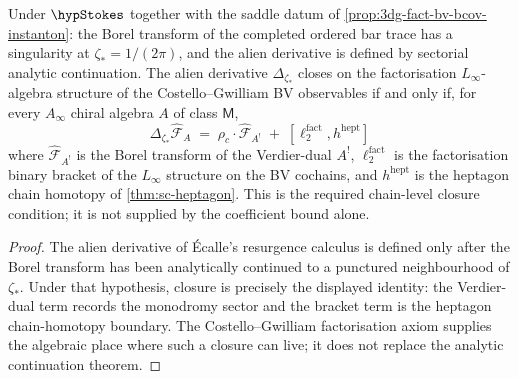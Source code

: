 \begin{theorem}
\label{thm:3dg-alien-derivative-fact-bv-closure}%
%
%
%
Under $\hypStokes$ together with the saddle datum of
\autoref{prop:3dg-fact-bv-bcov-instanton}: the Borel transform of the
completed ordered bar trace has a singularity at
$\zeta_{\ast} = 1/(2\pi)$, and the alien derivative is defined by
sectorial analytic continuation. The alien derivative
$\Delta_{\zeta_{\ast}}$ closes on the factorisation
$L_{\infty}$-algebra structure of the Costello--Gwilliam BV
observables if and only if, for every $A_{\infty}$ chiral algebra $A$
of class $\mathsf M$,
\[
 \Delta_{\zeta_{\ast}}\widehat{\mathcal F}_{A}
 \;=\;
 \rho_{c}\cdot\widehat{\mathcal F}_{A^{!}}
 \;+\;
 [\ell_{2}^{\mathrm{fact}}, h^{\mathrm{hept}}]
\]
where $\widehat{\mathcal F}_{A^{!}}$ is the Borel transform of the
Verdier-dual $A^{!}$, $\ell_{2}^{\mathrm{fact}}$ is the factorisation
binary bracket of the $L_\infty$ structure on the BV cochains, and
$h^{\mathrm{hept}}$ is the heptagon chain homotopy of
\autoref{thm:sc-heptagon}. This is the required chain-level closure
condition; it is not supplied by the coefficient bound alone.
\end{theorem}

\begin{proof}
The alien derivative of \'Ecalle's resurgence calculus
\cite{Ecalle1981} is defined only after the Borel transform has been
analytically continued to a punctured neighbourhood of
\(\zeta_\ast\). Under that hypothesis, closure is precisely the
displayed identity: the Verdier-dual term records the monodromy
sector and the bracket term is the heptagon chain-homotopy boundary.
The Costello--Gwilliam factorisation axiom supplies the algebraic
place where such a closure can live; it does not replace the analytic
continuation theorem.
\end{proof}

